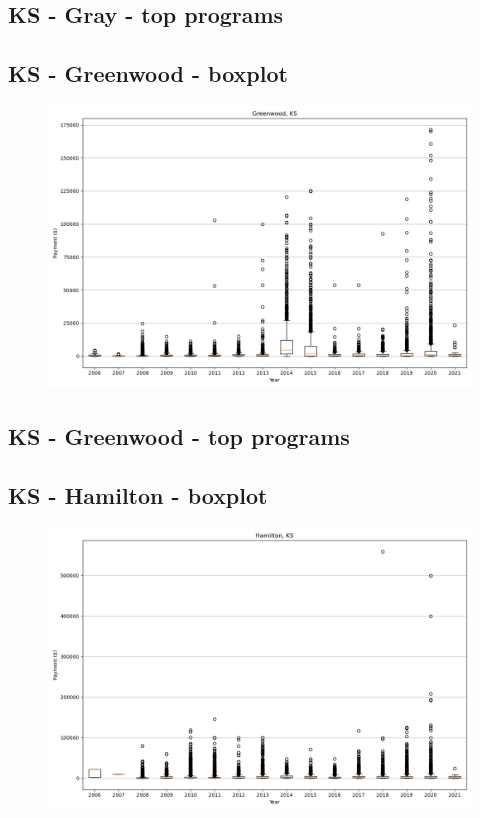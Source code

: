 \subsection*{KS - Gray - top programs}

\newpage
\subsection*{KS - Greenwood - boxplot}
\begin{figure}[h]
\centering
\includegraphics[width=7in]{../output/boxplots/counties/Greenwood-KS_boxplot.png}
\end{figure}


\subsection*{KS - Greenwood - top programs}

\newpage
\subsection*{KS - Hamilton - boxplot}
\begin{figure}[h]
\centering
\includegraphics[width=7in]{../output/boxplots/counties/Hamilton-KS_boxplot.png}
\end{figure}


